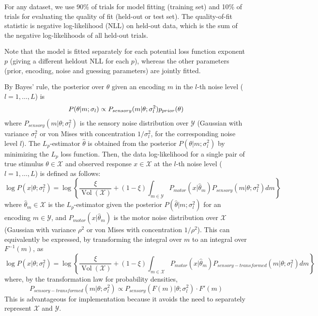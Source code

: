 For any dataset, we use 90\% of trials for model fitting (training set) and 10\% of trials for evaluating the quality of fit (held-out or test set).
The quality-of-fit statistic is negative log-likelihood (NLL) on held-out data, which is the sum of the negative log-likelihoods of all held-out trials.

Note that the model is fitted separately for each potential loss function exponent $p$ (giving a different heldout NLL for each $p$), whereas the other parameters (prior, encoding, noise and guessing parameters) are jointly fitted.


By Bayes' rule, the posterior over $\theta$ given an encoding $m$ in the $l$-th noise level ($l = 1, \dots, L$) is
\begin{equation}
P(\theta|m; \sigma_l) \propto P_{sensory}(m|\theta; \sigma_l^2) p_{prior}(\theta)
\end{equation}
where $P_{sensory}(m|\theta; \sigma_l^2)$ is the sensory noise distribution over $\mathcal{Y}$ (Gaussian with variance $\sigma_l^2$ or von Mises with concentration $1/\sigma_l^2$, for the corresponding noise level $l$).
The $L_p$-estimator $\hat{\theta}$ is obtained from the posterior $P(\theta|m; \sigma_l^2)$ by minimizing the $L_p$ loss function.
Then, the data log-likelihood for a single pair of true stimulus $\theta \in \mathcal{X}$ and observed response $x \in \mathcal{X}$ at the $l$-th noise level ($l=1, \dots, L$) is defined as follows:
\begin{equation}\label{eq:data-likelihood-raw}
\log P(x|\theta; \sigma_l^2) = \log \left\{ \frac{\xi}{\operatorname{Vol}(\mathcal{X})} + (1-\xi)  \int_{m \in \mathcal{Y}} P_{motor}(x|\hat{\theta}_m) P_{sensory}(m|\theta; \sigma_l^2) dm \right\}
\end{equation}
where $\hat{\theta}_m \in \mathcal{X}$ is the $L_p$-estimator given the posterior $P(\hat{\theta}|m; \sigma_l^2)$ for an encoding $m \in \mathcal{Y}$, and $P_{motor}(x|\hat{\theta}_m)$ is the motor noise distribution over $\mathcal{X}$ (Gaussian with variance $\rho^2$ or von Mises with concentration $1/\rho^2$).
This can equivalently be expressed, by transforming the integral over $m$ to an integral over $F^{-1}(m)$, as
\begin{equation}\label{eq:data-likelihood}
\log P(x|\theta; \sigma_l^2) = \log \left\{ \frac{\xi}{\operatorname{Vol}(\mathcal{X})} + (1-\xi)  \int_{m \in \mathcal{X}} P_{motor}(x|\hat{\theta}_m) P_{sensory-transformed}(m|\theta; \sigma_l^2) dm \right\}
\end{equation}
where, by the transformation law for probability densities,
\begin{equation}
P_{sensory-transformed}(m|\theta; \sigma_l^2) \propto P_{sensory}(F(m)|\theta; \sigma_l^2) \cdot F'(m)
\end{equation}
This is advantageous for implementation because it avoids the need to separately represent $\mathcal{X}$ and $\mathcal{Y}$.

